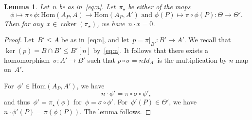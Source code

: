 \documentclass[12pt]{amsart}
\newtheorem{lemma}[theorem]{Lemma}
\newcommand{\Hom}{\mbox{Hom}}
\newcommand{\End}{{\rm End}}
\DeclareMathOperator{\coker}{\operatorname{coker}}
\begin{document}
\begin{lemma}\label{lem:C2}
Let~$n$ be as in~\eqref{eq:n}. Let~$\pi_{\star}$ be either of the maps
\[
\phi\mapsto \pi\circ \phi:\Hom(A_P,A)\to\Hom(A_P,A')\text{ and }\phi(P)\mapsto \pi\circ\phi(P):\Theta\to \Theta'.
\]
Then for any~$x\in \coker(\pi_{\star})$, we have~$n\cdot x=0$.
\end{lemma}
\begin{proof}
Let~$B'\leq A$ be as in~\eqref{eq:n}, and let~$p=\pi|_{B'}: B' \to A'$. We recall that~$\ker(p) = B \cap B'\leq B'[n]$ by~\eqref{eq:n}.  It follows that there exists a homomorphism~$\sigma: A' \to B'$ such that $p \circ \sigma=n Id_{A'}$ is the multiplication-by-$n$ map on~$A'$. 

For~$\phi'\in \Hom(A_P,A')$, we have 
\[
n\cdot \phi'=\pi\circ \sigma\circ \phi',
\]
and thus~$\phi'=\pi_\star(\phi)$ for~$\phi=\sigma\circ \phi'$. For~$\phi'(P)\in \Theta'$, we have~$n\cdot \phi'(P)=\pi( \phi(P))$. The lemma follows.
\end{proof}
%
\end{document}

